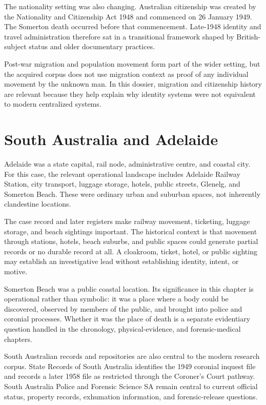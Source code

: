 The nationality setting was also changing. Australian citizenship was created by the Nationality and Citizenship Act 1948 and commenced on 26 January 1949. The Somerton death occurred before that commencement. Late-1948 identity and travel administration therefore sat in a transitional framework shaped by British-subject status and older documentary practices.

Post-war migration and population movement form part of the wider setting, but the acquired corpus does not use migration context as proof of any individual movement by the unknown man. In this dossier, migration and citizenship history are relevant because they help explain why identity systems were not equivalent to modern centralized systems.

\section{South Australia and Adelaide}

Adelaide was a state capital, rail node, administrative centre, and coastal city. For this case, the relevant operational landscape includes Adelaide Railway Station, city transport, luggage storage, hotels, public streets, Glenelg, and Somerton Beach. These were ordinary urban and suburban spaces, not inherently clandestine locations.

The case record and later registers make railway movement, ticketing, luggage storage, and beach sightings important. The historical context is that movement through stations, hotels, beach suburbs, and public spaces could generate partial records or no durable record at all. A cloakroom, ticket, hotel, or public sighting may establish an investigative lead without establishing identity, intent, or motive.

Somerton Beach was a public coastal location. Its significance in this chapter is operational rather than symbolic: it was a place where a body could be discovered, observed by members of the public, and brought into police and coronial processes. Whether it was the place of death is a separate evidentiary question handled in the chronology, physical-evidence, and forensic-medical chapters.

South Australian records and repositories are also central to the modern research corpus. State Records of South Australia identifies the 1949 coronial inquest file and records a later 1958 file as restricted through the Coroner's Court pathway. South Australia Police and Forensic Science SA remain central to current official status, property records, exhumation information, and forensic-release questions.


